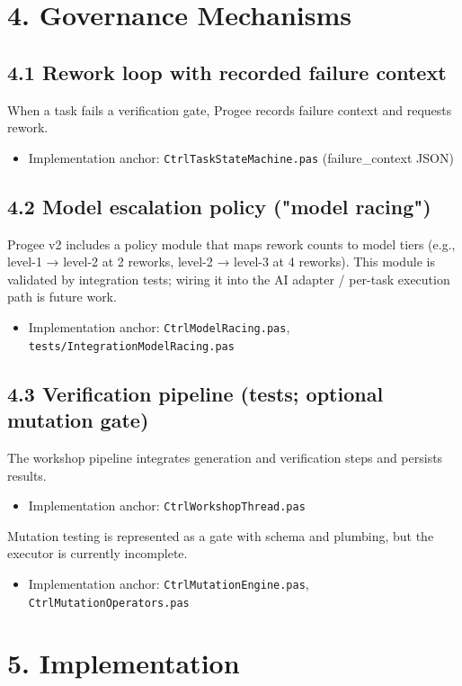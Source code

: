 \documentclass[11pt]{article}
\begin{document}
\section{4. Governance Mechanisms}
\subsection{4.1 Rework loop with recorded failure context}
When a task fails a verification gate, Progee records failure context and requests rework.
\begin{itemize}
\item Implementation anchor: \texttt{CtrlTaskStateMachine.pas} (failure\_context JSON)
\end{itemize}

\subsection{4.2 Model escalation policy ("model racing")}
Progee v2 includes a policy module that maps rework counts to model tiers (e.g., level-1 → level-2 at 2 reworks, level-2 → level-3 at 4 reworks). This module is validated by integration tests; wiring it into the AI adapter / per-task execution path is future work.
\begin{itemize}
\item Implementation anchor: \texttt{CtrlModelRacing.pas}, \texttt{tests/IntegrationModelRacing.pas}
\end{itemize}

\subsection{4.3 Verification pipeline (tests; optional mutation gate)}
The workshop pipeline integrates generation and verification steps and persists results.
\begin{itemize}
\item Implementation anchor: \texttt{CtrlWorkshopThread.pas}
\end{itemize}

Mutation testing is represented as a gate with schema and plumbing, but the executor is currently incomplete.
\begin{itemize}
\item Implementation anchor: \texttt{CtrlMutationEngine.pas}, \texttt{CtrlMutationOperators.pas}
\end{itemize}

\section{5. Implementation}
\end{document}
